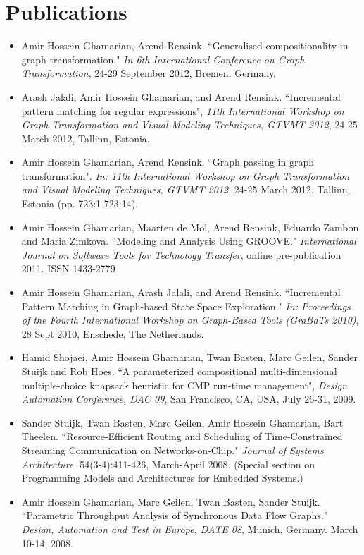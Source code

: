 \section{Publications}
\begin{itemize}
\item Amir Hossein Ghamarian, Arend Rensink. ``Generalised compositionality in graph transformation." \emph{In 6th International Conference on Graph Transformation}, 24-29 September 2012, Bremen, Germany.
\item Arash Jalali, Amir Hossein Ghamarian, and Arend Rensink. ``Incremental pattern matching for regular expressions", \emph{11th International Workshop on Graph Transformation and Visual Modeling Techniques, GTVMT 2012}, 24-25 March 2012, Tallinn, Estonia.
\item Amir Hossein Ghamarian, Arend Rensink. ``Graph passing in graph transformation". \emph{In: 11th International Workshop on Graph Transformation and Visual Modeling Techniques, GTVMT 2012}, 24-25 March 2012, Tallinn, Estonia (pp. 723:1-723:14).
\item Amir Hossein Ghamarian, Maarten de Mol, Arend Rensink, Eduardo
Zambon and Maria Zimkova. ``Modeling and Analysis Using GROOVE." \emph{
International Journal on Software Tools for Technology Transfer},
online pre-publication 2011. ISSN 1433-2779

\item Amir Hossein Ghamarian, Arash Jalali, and Arend Rensink. ``Incremental
Pattern Matching in Graph-based State Space Exploration." \emph{In: Proceedings of the Fourth
International Workshop on Graph-Based Tools (GraBaTs 2010)}, 28 Sept 2010, Enschede, The Netherlands.

\item Hamid Shojaei, Amir Hossein Ghamarian, Twan Basten, Marc Geilen, Sander Stuijk and Rob Hoes.
``A parameterized compositional multi-dimensional multiple-choice knapsack heuristic for CMP run-time management",
\emph{Design Automation Conference, DAC 09}, San Francisco, CA, USA, July 26-31, 2009.

\item Sander Stuijk, Twan
Basten, Marc Geilen, Amir Hossein Ghamarian, Bart Theelen.
``Resource-Efficient Routing and Scheduling of Time-Constrained
Streaming Communication on Networks-on-Chip." \emph{Journal of
Systems Architecture.} 54(3-4):411-426, March-April 2008. (Special
section on Programming Models and Architectures for Embedded
Systems.)

\item Amir Hossein Ghamarian, Marc Geilen, Twan
Basten, Sander Stuijk. ``Parametric Throughput Analysis of
Synchronous Data Flow Graphs." \emph{Design, Automation and Test in
Europe, DATE 08}, Munich, Germany. March 10-14, 2008.


\end{itemize}
